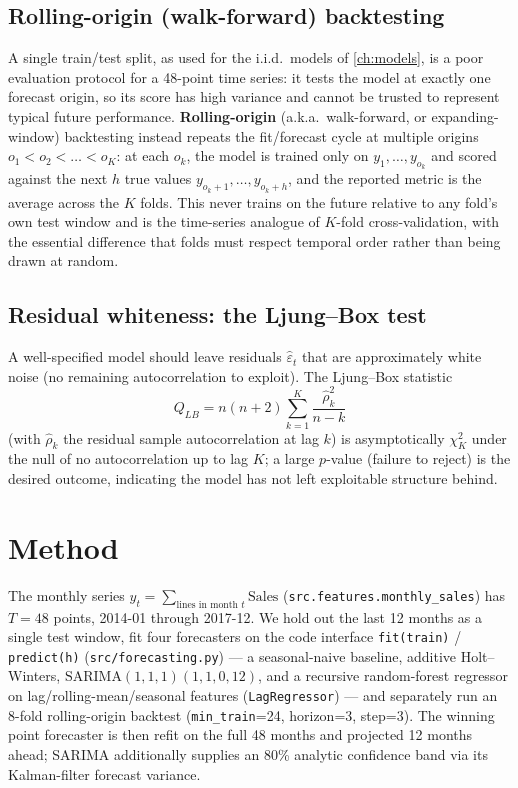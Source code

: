 \subsection{Rolling-origin (walk-forward) backtesting}
A single train/test split, as used for the i.i.d.\ models of
\cref{ch:models}, is a poor evaluation protocol for a 48-point time
series: it tests the model at exactly one forecast origin, so its score
has high variance and cannot be trusted to represent typical future
performance. \textbf{Rolling-origin} (a.k.a.\ walk-forward, or expanding-
window) backtesting instead repeats the fit/forecast cycle at multiple
origins $o_1 < o_2 < \dots < o_K$: at each $o_k$, the model is trained
only on $y_1,\dots,y_{o_k}$ and scored against the next $h$ true values
$y_{o_k+1},\dots,y_{o_k+h}$, and the reported metric is the average
across the $K$ folds. This never trains on the future relative to any
fold's own test window and is the time-series analogue of $K$-fold
cross-validation, with the essential difference that folds must respect
temporal order rather than being drawn at random.

\subsection{Residual whiteness: the Ljung--Box test}
A well-specified model should leave residuals $\hat\varepsilon_t$ that
are approximately white noise (no remaining autocorrelation to exploit).
The Ljung--Box statistic
\begin{equation}
  Q_{LB} = n(n+2)\sum_{k=1}^{K}\frac{\hat\rho_k^2}{n-k}
  \label{eq:ljungbox}
\end{equation}
(with $\hat\rho_k$ the residual sample autocorrelation at lag $k$)
is asymptotically $\chi^2_K$ under the null of no autocorrelation up to
lag $K$; a large $p$-value (failure to reject) is the desired outcome,
indicating the model has not left exploitable structure behind.

\section{Method}
The monthly series $y_t = \sum_{\text{lines in month } t} \text{Sales}$
(\texttt{src.features.monthly\_sales}) has $T=48$ points, 2014-01 through
2017-12. We hold out the last 12 months as a single test window, fit
four forecasters on the code interface \texttt{fit(train)} /
\texttt{predict(h)} (\texttt{src/forecasting.py}) — a seasonal-naive
baseline, additive Holt--Winters, $\mathrm{SARIMA}(1,1,1)(1,1,0,12)$, and
a recursive random-forest regressor on lag/rolling-mean/seasonal features
(\texttt{LagRegressor}) — and separately run an 8-fold rolling-origin
backtest (\texttt{min\_train}=24, horizon=3, step=3). The winning point
forecaster is then refit on the full 48 months and projected 12 months
ahead; SARIMA additionally supplies an 80\% analytic confidence band via
its Kalman-filter forecast variance.

